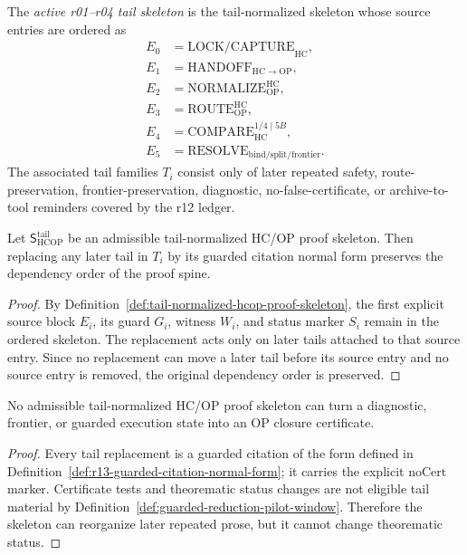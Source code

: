 \begin{definition}
\label{def:active-r01-r04-tail-skeleton}
The \emph{active r01--r04 tail skeleton} is the tail-normalized skeleton whose source entries are ordered as
\[
\begin{aligned}
E_0&=\mathrm{LOCK/CAPTURE}_{\mathrm{HC}},\\
E_1&=\mathrm{HANDOFF}_{\mathrm{HC}\to\mathrm{OP}},\\
E_2&=\mathrm{NORMALIZE}_{\mathrm{OP}}^{\mathrm{HC}},\\
E_3&=\mathrm{ROUTE}_{\mathrm{OP}}^{\mathrm{HC}},\\
E_4&=\mathrm{COMPARE}_{\mathrm{HC}}^{1/4\mid 5B},\\
E_5&=\mathrm{RESOLVE}_{\mathrm{bind/split/frontier}} .
\end{aligned}
\]
The associated tail families \(T_i\) consist only of later repeated safety, route-preservation, frontier-preservation, diagnostic, no-false-certificate, or archive-to-tool reminders covered by the r12 ledger.
\end{definition}

\begin{lemma}
\label{lem:tail-skeleton-preserves-dependency-order}
Let \(\mathsf S_{\mathrm{HCOP}}^{\mathrm{tail}}\) be an admissible tail-normalized HC/OP proof skeleton. Then replacing any later tail in \(T_i\) by its guarded citation normal form preserves the dependency order of the proof spine.
\end{lemma}

\begin{proof}
By Definition~\ref{def:tail-normalized-hcop-proof-skeleton}, the first explicit source block \(E_i\), its guard \(G_i\), witness \(W_i\), and status marker \(S_i\) remain in the ordered skeleton. The replacement acts only on later tails attached to that source entry. Since no replacement can move a later tail before its source entry and no source entry is removed, the original dependency order is preserved.
\end{proof}

\begin{lemma}
\label{lem:tail-skeleton-does-not-create-certificates}
No admissible tail-normalized HC/OP proof skeleton can turn a diagnostic, frontier, or guarded execution state into an OP closure certificate.
\end{lemma}

\begin{proof}
Every tail replacement is a guarded citation of the form defined in Definition~\ref{def:r13-guarded-citation-normal-form}; it carries the explicit \(\mathrm{noCert}\) marker. Certificate tests and theorematic status changes are not eligible tail material by Definition~\ref{def:guarded-reduction-pilot-window}. Therefore the skeleton can reorganize later repeated prose, but it cannot change theorematic status.
\end{proof}

